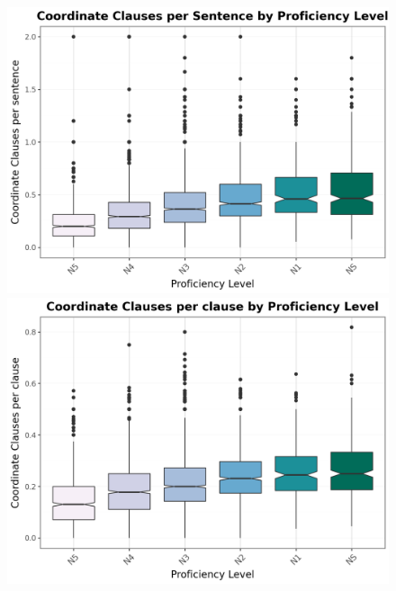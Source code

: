 \begin{figure}[htbp]
    \centering
    \begin{minipage}{.48\textwidth}
        \centering
    \includegraphics[scale=.3]{img/CCperSent}
    \caption[Average Coordinate Clauses to Sentences across JLPT levels]{}
        \label{fig:CCperSent}
    \end{minipage}
    \hfill
\begin{minipage}{.48\textwidth}
        \centering
        \includegraphics[scale=.3]{img/CCperC}
        \caption[Average Coordinate Clauses to Clauses ratio across JLPT levels.]{}
\label{fig:CCperCl}
\end{minipage}
    \end{figure}

